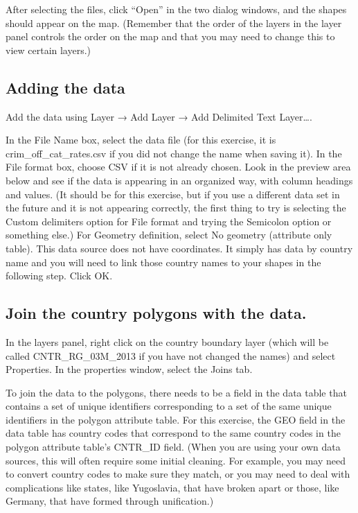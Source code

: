 \documentclass[]{book}
\begin{document}
After selecting the files, click ``Open'' in the two dialog windows, and the shapes should appear on the map. (Remember that the order of the layers in the layer panel controls the order on the map and that you may need to change this to view certain layers.)

\hypertarget{adding-the-data}{%
\subsection{Adding the data}\label{adding-the-data}}

Add the data using Layer → Add Layer → Add Delimited Text Layer\ldots{}.

In the File Name box, select the data file (for this exercise, it is crim\_off\_cat\_rates.csv if you did not change the name when saving it). In the File format box, choose CSV if it is not already chosen. Look in the preview area below and see if the data is appearing in an organized way, with column headings and values. (It should be for this exercise, but if you use a different data set in the future and it is not appearing correctly, the first thing to try is selecting the Custom delimiters option for File format and trying the Semicolon option or something else.) For Geometry definition, select No geometry (attribute only table). This data source does not have coordinates. It simply has data by country name and you will need to link those country names to your shapes in the following step. Click OK.

\hypertarget{join-the-country-polygons-with-the-data.}{%
\subsection{Join the country polygons with the data.}\label{join-the-country-polygons-with-the-data.}}

In the layers panel, right click on the country boundary layer (which will be called CNTR\_RG\_03M\_2013 if you have not changed the names) and select Properties. In the properties window, select the Joins tab.

To join the data to the polygons, there needs to be a field in the data table that contains a set of unique identifiers corresponding to a set of the same unique identifiers in the polygon attribute table. For this exercise, the GEO field in the data table has country codes that correspond to the same country codes in the polygon attribute table's CNTR\_ID field. (When you are using your own data sources, this will often require some initial cleaning. For example, you may need to convert country codes to make sure they match, or you may need to deal with complications like states, like Yugoslavia, that have broken apart or those, like Germany, that have formed through unification.)
\end{document}
